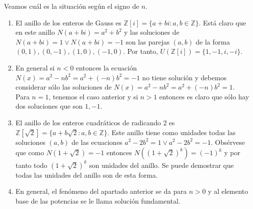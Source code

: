 \begin{example}
Veamos cuál es la situación según el signo de $n$. 

\begin{enumerate}
\item El anillo de los enteros de Gauss es $\mathbb{Z}[i] = \{a+bi:a,b \in \mathbb{Z}\}$. Está claro que en este anillo $N(a+bi) = a^2 + b^2$ y las soluciones de $N(a+bi) = 1 \lor N(a+bi) = -1$ son las parejas $(a,b)$ de la forma $(0,1),(0,-1),(1,0),(-1,0)$. Por tanto, $U(\mathbb{Z}[i]) = \{1,-1,i,-i\}$. 

\begin{figure}[H]
\centering
{}
\end{figure}

\item En general si $n < 0$ entonces la ecuación $N(x) = a^2 - nb^2 = a^2 + (-n)b^2 = -1$ no tiene solución y debemos considerar sólo las soluciones de $N(x) = a^2 - nb^2 = a^2 + (-n)b^2 = 1$. Para $n = 1$, tenemos el caso anterior y si $n > 1$ entonces es claro que sólo hay dos soluciones que son $1,-1$. 

\item El anillo de los enteros cuadráticos de radicando 2 es $\mathbb{Z}[\sqrt{2}] = \{a+b\sqrt{2}:a,b \in \mathbb{Z}\}$. Este anillo tiene como unidades todas las soluciones $(a,b)$ de las ecuaciones $a^2-2b^2 = 1 \lor a^2-2b^2 = -1$. Obsérvese que como $N(1+ \sqrt{2}) = -1$ entonces $N((1+\sqrt{2})^k) = (-1)^k$ y por tanto todo $(1+\sqrt{2})^k$ son unidades del anillo. Se puede demostrar que todas las unidades del anillo son de esta forma. 

\item En general, el fenómeno del apartado anterior se da para $n > 0$ y al elemento base de las potencias se le llama solución fundamental. 
\end{enumerate}
\end{example}

